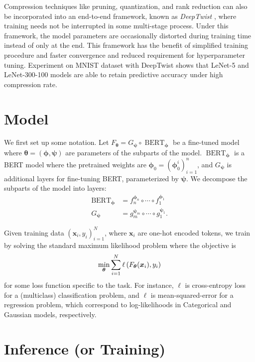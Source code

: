 \documentclass[10pt]{article}
\newcommand{\bert}{\operatorname{BERT}}
\newcommand{\btheta}{{\bm{\theta}}}
\newcommand{\bphi}{{\bm{\phi}}}
\newcommand{\bpsi}{{\bm{\psi}}}
\begin{document}
Compression techniques like pruning, quantization, and rank reduction can
also be incorporated into an end-to-end framework, known as 
\emph{DeepTwist}  \citep{lee2018deeptwist}, where training needs not be
interrupted in some multi-stage process. Under this
framework, the model parameters are occasionally distorted during training
time instead of only at the end. This framework has the benefit of simplified
training procedure and faster convergence and reduced requirement for
hyperparameter tuning. Experiment on MNIST dataset with DeepTwist shows that
LeNet-5 and LeNet-300-100 models are able to retain predictive accuracy under
high compression rate.



\section{Model}
\label{sec:model}

We first set up some notation. Let $F_\btheta = G_\bpsi \circ \bert_\bphi$ be
a fine-tuned model where $\btheta = (\bphi, \bpsi)$ are parameters of the
subparts of the model. $\bert_\bphi$ is a BERT model where the pretrained
weights are $\bphi_0 = (\bphi_0^i)_{i=1}^n$, and $G_\bpsi$ is additional
layers for fine-tuning BERT, parameterized by $\bpsi$. We decompose the
subparts of the model into layers: \begin{align*}
\bert_\bphi &= f_{n}^{\bphi_n} \circ \cdots \circ f_1^{\bphi_1} \\
G_\bpsi &= g_{m}^{\bpsi_m} \circ \cdots \circ g_1^{\bpsi_1}.
\end{align*}



Given training data $(\bm x_i, y_i)_{i=1}^N$, where $\bm x_i$ are one-hot
encoded tokens, we train by solving the standard maximum likelihood problem
where the objective is \[
\min_{\btheta} \sum_{i=1}^N \ell\pr{F_\btheta(\bm x_i), y_i}
\]
for some loss function specific to the task. For instance, $\ell$ is
cross-entropy loss for a (multiclass) classification problem, and $\ell$ is
mean-squared-error for a regression problem, which correspond to
log-likelihoods in Categorical and Gaussian models, respectively. 



\section{Inference (or Training)}
\label{sec:training}
\end{document}
